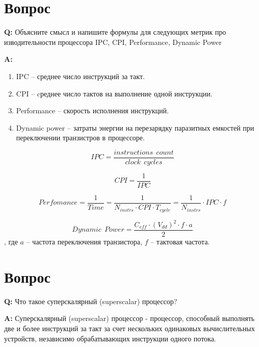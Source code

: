 \documentclass[12pt, letterpaper]{article}
\begin{document}



\section{Вопрос}

\textbf{Q: } Объясните смысл и напишите формулы для следующих метрик про
изводительности процессора IPC, CPI, Performance, Dynamic Power

\textbf{A: }

\begin{enumerate}
    \item IPC -- среднее число инструкций за такт.
    \item CPI -- cреднее число тактов на выполнение одной инструкции.
    \item Performance -- скорость исполнения инструкций.
    \item Dynamic power -- затраты энергии на перезарядку паразитных емкостей при переключении транзистров в процессоре.
\end{enumerate}

\begin{equation}
    IPC = \frac{instructions \:\: count}{clock \:\: cycles}
\end{equation}

\begin{equation}
    CPI = \frac{1}{IPC}
\end{equation}

\begin{equation}
    Perfomance = \frac{1}{Time} = \frac{1}{N_{instrs} \cdot CPI \cdot T_{cycle}} = \frac{1}{N_{instrs}} \cdot IPC \cdot f
\end{equation}

\begin{equation}
    Dynamic \:\: Power = \frac{C_{eff} \cdot (V_{dd})^{2} \cdot f \cdot a}{2}
\end{equation}
, где $a$ -- частота переключения транзистора, $f$ -- тактовая частота.
\newpage

\section{Вопрос}

\textbf{Q: } Что такое суперскалярный (superscalar) процессор?

\textbf{A: } Суперскалярный (superscalar) процессор - процессор, способный выполнять две и более инструкций за такт за счет нескольких одинаковых вычислительных устройств, независимо обрабатывающих инструкции одного потока.
\end{document}
